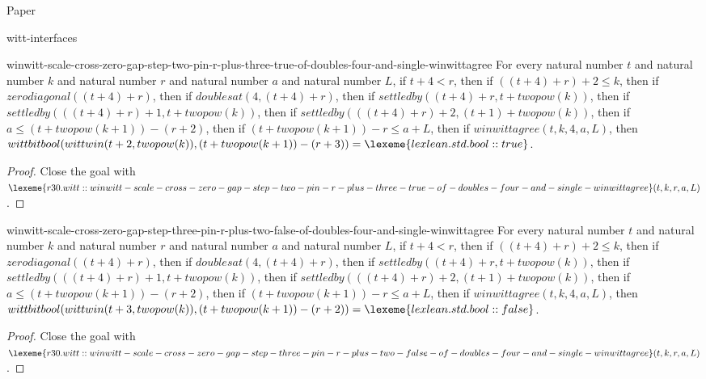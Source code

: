 \begin{lexlean}{Paper}
\begin{section}{witt-interfaces}
  \begin{theorem}{winwitt-scale-cross-zero-gap-step-two-pin-r-plus-three-true-of-doubles-four-and-single-winwittagree}
  For every natural number \(t\) and natural number \(k\) and natural number \(r\) and natural number \(a\) and natural number \(L\), if \(t + 4 < r\), then if \(((t + 4) + r) + 2 ≤ k\), then if \(zerodiagonal((t + 4) + r)\), then if \(doublesat(4, (t + 4) + r)\), then if \(settledby((t + 4) + r, t + twopow(k))\), then if \(settledby(((t + 4) + r) + 1, t + twopow(k))\), then if \(settledby(((t + 4) + r) + 2, (t + 1) + twopow(k))\), then if \(a ≤ (t + twopow(k + 1)) - (r + 2)\), then if \((t + twopow(k + 1)) - r ≤ a + L\), then if \(winwittagree(t, k, 4, a, L)\), then \(wittbitbool(wittwin(t + 2, twopow(k)), (t + twopow(k + 1)) - (r + 3)) = \lexeme{lexlean.std.bool::true}\).
  \begin{proof}
  Close the goal with \(\lexeme{r30.witt::winwitt-scale-cross-zero-gap-step-two-pin-r-plus-three-true-of-doubles-four-and-single-winwittagree}(t, k, r, a, L)\).
  \end{proof}
  \end{theorem}

  \begin{theorem}{winwitt-scale-cross-zero-gap-step-three-pin-r-plus-two-false-of-doubles-four-and-single-winwittagree}
  For every natural number \(t\) and natural number \(k\) and natural number \(r\) and natural number \(a\) and natural number \(L\), if \(t + 4 < r\), then if \(((t + 4) + r) + 2 ≤ k\), then if \(zerodiagonal((t + 4) + r)\), then if \(doublesat(4, (t + 4) + r)\), then if \(settledby((t + 4) + r, t + twopow(k))\), then if \(settledby(((t + 4) + r) + 1, t + twopow(k))\), then if \(settledby(((t + 4) + r) + 2, (t + 1) + twopow(k))\), then if \(a ≤ (t + twopow(k + 1)) - (r + 2)\), then if \((t + twopow(k + 1)) - r ≤ a + L\), then if \(winwittagree(t, k, 4, a, L)\), then \(wittbitbool(wittwin(t + 3, twopow(k)), (t + twopow(k + 1)) - (r + 2)) = \lexeme{lexlean.std.bool::false}\).
  \begin{proof}
  Close the goal with \(\lexeme{r30.witt::winwitt-scale-cross-zero-gap-step-three-pin-r-plus-two-false-of-doubles-four-and-single-winwittagree}(t, k, r, a, L)\).
  \end{proof}
  \end{theorem}


\end{section}
\end{lexlean}
